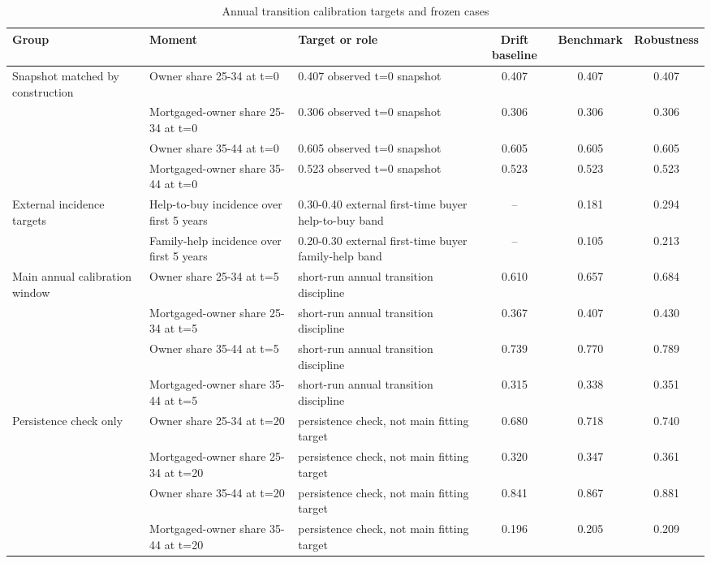 \begin{table}[htbp]
\centering
\caption{Annual transition calibration targets and frozen cases}
\label{tab:annual_transition_calibration_targets}
\begin{tabular}{p{3.2cm} p{4.0cm} p{4.6cm} c c c}
\toprule
Group & Moment & Target or role & Drift baseline & Benchmark & Robustness \\
\midrule
Snapshot matched by construction & Owner share 25-34 at t=0 & 0.407 observed t=0 snapshot & 0.407 & 0.407 & 0.407 \\
 & Mortgaged-owner share 25-34 at t=0 & 0.306 observed t=0 snapshot & 0.306 & 0.306 & 0.306 \\
 & Owner share 35-44 at t=0 & 0.605 observed t=0 snapshot & 0.605 & 0.605 & 0.605 \\
 & Mortgaged-owner share 35-44 at t=0 & 0.523 observed t=0 snapshot & 0.523 & 0.523 & 0.523 \\
External incidence targets & Help-to-buy incidence over first 5 years & 0.30-0.40 external first-time buyer help-to-buy band & -- & 0.181 & 0.294 \\
 & Family-help incidence over first 5 years & 0.20-0.30 external first-time buyer family-help band & -- & 0.105 & 0.213 \\
Main annual calibration window & Owner share 25-34 at t=5 & short-run annual transition discipline & 0.610 & 0.657 & 0.684 \\
 & Mortgaged-owner share 25-34 at t=5 & short-run annual transition discipline & 0.367 & 0.407 & 0.430 \\
 & Owner share 35-44 at t=5 & short-run annual transition discipline & 0.739 & 0.770 & 0.789 \\
 & Mortgaged-owner share 35-44 at t=5 & short-run annual transition discipline & 0.315 & 0.338 & 0.351 \\
Persistence check only & Owner share 25-34 at t=20 & persistence check, not main fitting target & 0.680 & 0.718 & 0.740 \\
 & Mortgaged-owner share 25-34 at t=20 & persistence check, not main fitting target & 0.320 & 0.347 & 0.361 \\
 & Owner share 35-44 at t=20 & persistence check, not main fitting target & 0.841 & 0.867 & 0.881 \\
 & Mortgaged-owner share 35-44 at t=20 & persistence check, not main fitting target & 0.196 & 0.205 & 0.209 \\
\bottomrule
\end{tabular}
\end{table}
